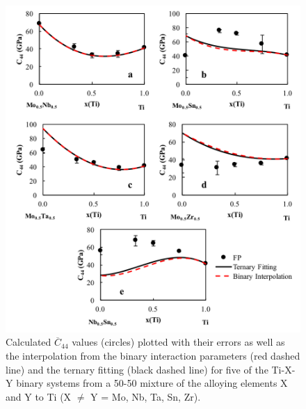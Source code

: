 \pagebreak
\begin{figure}[H]
	\centering
	\includegraphics[width=\textwidth]{Chapter-6/Figures/tixyc441.png}
	\caption{Calculated $\overline{C}_{44}$ values (circles) plotted with their errors as well as the interpolation from the binary interaction parameters (red dashed line) and the ternary fitting (black dashed line) for five of the Ti-X-Y binary systems from a 50-50 mixture of the alloying elements X and Y to Ti (X $\neq$ Y = Mo, Nb, Ta, Sn, Zr).}
	\label{Ch6-figure:tixyc44_1}
\end{figure}


